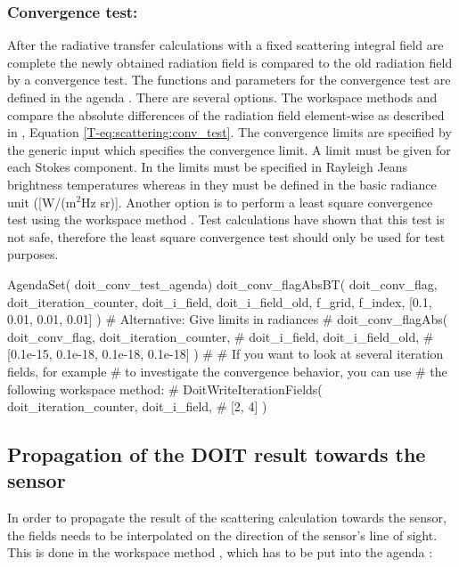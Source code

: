 \subsubsection{Convergence test:}
After the radiative transfer calculations with a fixed scattering
integral field are complete the newly obtained radiation field is
compared to the old radiation field by a convergence test. The
functions and parameters for the convergence test are defined in the
agenda . There are several
options. The workspace methods  and
 compare the absolute differences of the
radiation field element-wise as described in
\theory, Equation \ref{T-eq:scattering:conv_test}. The convergence limits are specified by the
generic input  which specifies the convergence limit. A limit
must be given for each Stokes component. In
 the limits must be specified in
Rayleigh Jeans brightness temperatures whereas in
 they must be defined in the basic radiance unit
([W/(m$^2$Hz sr)]. Another option is to perform a least square
convergence test using the workspace method
. Test calculations have shown that this
test is not safe, therefore the least square convergence test should
only be used for test purposes.
\begin{code}
AgendaSet( doit_conv_test_agenda) {
    doit_conv_flagAbsBT( doit_conv_flag, doit_iteration_counter,
                         doit_i_field, doit_i_field_old,
                         f_grid, f_index,
                         [0.1, 0.01, 0.01, 0.01] )
    # Alternative: Give limits in radiances
    #   doit_conv_flagAbs( doit_conv_flag, doit_iteration_counter,
    #                      doit_i_field, doit_i_field_old,
    #                      [0.1e-15, 0.1e-18, 0.1e-18, 0.1e-18] )
    #
    # If you want to look at several iteration fields, for example 
    # to investigate the convergence behavior, you can use
    # the following workspace method:
    # DoitWriteIterationFields( doit_iteration_counter, doit_i_field,
    #                           [2, 4] )
}
\end{code}
\subsection{Propagation of the DOIT result towards the sensor}
In order to propagate the result of the scattering calculation towards
the sensor, the fields needs to be interpolated on the direction of
the sensor's line of sight. This is done in the workspace method
, which has to be put into the agenda
:

